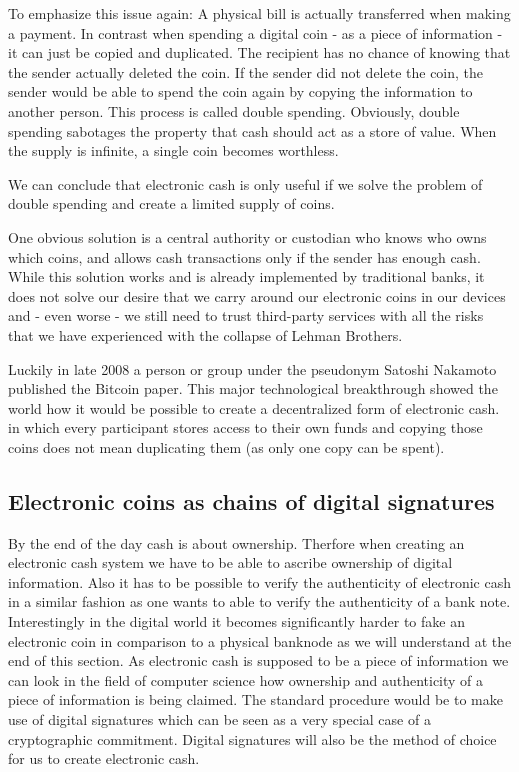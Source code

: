 \documentclass[ebook,12pt,oneside,openany]{memoir}
\begin{document}
To emphasize this issue again: A physical bill is actually transferred when making a payment. In contrast when spending a digital coin - as a piece of information - it can just be copied and duplicated.
The recipient has no chance of knowing that the sender actually deleted the coin.
If the sender did not delete the coin, the sender would be able to spend the coin again by copying the information to another person.
This process is called double spending.
Obviously, double spending sabotages the property that cash should act as a store of value. When the supply is infinite, a single coin becomes worthless. 

We can conclude that electronic cash is only useful if we solve the problem of double spending and create a limited supply of coins.

One obvious solution is a central authority or custodian who knows who owns which coins, and allows cash transactions only if the sender has enough cash.
While this solution works and is already implemented by traditional banks, it does not solve our desire that we carry around our electronic coins in our devices and - even worse - we still need to trust third-party services with all the risks that we have experienced with the collapse of Lehman Brothers.

Luckily in late 2008 a person or group under the pseudonym Satoshi Nakamoto published the Bitcoin paper.
This major technological breakthrough showed the world how it would be possible to create a decentralized form of electronic cash.
in which every participant stores access to their own funds and copying those coins does not mean duplicating them (as only one copy can be spent).

\subsection{Electronic coins as chains of digital signatures}
By the end of the day cash is about ownership.
Therfore when creating an electronic cash system we have to be able to ascribe ownership of digital information.
Also it has to be possible to verify the authenticity of electronic cash in a similar fashion as one wants to able to verify the authenticity of a bank note.
Interestingly in the digital world it becomes significantly harder to fake an electronic coin in comparison to a physical banknode as we will understand at the end of this section.
As electronic cash is supposed to be a piece of information we can look in the field of computer science how ownership and authenticity of a piece of information is being claimed.
The standard procedure would be to make use of \gls{digital signature}s which can be seen as a very special case of a \gls{cryptographic commitment}.
Digital signatures will also be the method of choice for us to create electronic cash.
\end{document}
